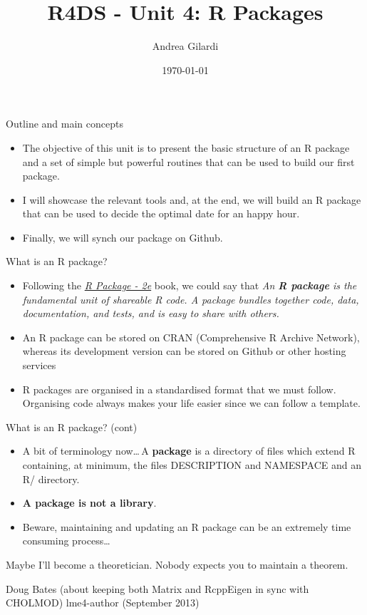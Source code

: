 \documentclass[
hyperref={bookmarks=false},
xcolor={dvipsnames,svgnames*,x11names*}, 
12pt
]{beamer}
\title{R4DS - Unit 4: R Packages}
\author{Andrea Gilardi}
\date{\today}
\begin{document}
\inserttitlepage

\begin{frame}{Outline and main concepts}
\vspace{-0.5cm}
\begin{itemize}
\itemsep 3ex
\item The objective of this unit is to present the basic structure of an R package and a set of simple but powerful routines that can be used to build our first package. 
\item I will showcase the relevant tools and, at the end, we will build an R package that can be used to decide the optimal date for an happy hour. 
\item Finally, we will synch our package on Github. 
\end{itemize}
\end{frame}	

\begin{frame}{What is an R package?}
\vspace{-0.5cm}
\begin{itemize}
\itemsep 3ex
\item Following the \href{https://r-pkgs.org/}{\emph{R Package - 2e}} book, we could say that \emph{An \textbf{R package} is the fundamental unit of shareable R code. A package bundles together code, data, documentation, and tests, and is easy to share with others.} 
\item An R package can be stored on CRAN (Comprehensive R Archive Network), whereas its development version can be stored on Github or other hosting services 
\item R packages are organised in a standardised format that we must follow. Organising code always makes your life easier since we can follow a template. 
\end{itemize}
\end{frame}	

\begin{frame}{What is an R package? (cont)}
\vspace{-0.5cm}
\begin{itemize}
\itemsep 2ex
\item A bit of terminology now\dots\,A \textbf{package} is a directory of files which extend R containing, at minimum, the files DESCRIPTION and NAMESPACE and an R/ directory. 
\item \textbf{A package is not a library}. 
\item Beware, maintaining and updating an R package can be an extremely time consuming process\dots 
\end{itemize}
\vspace{-0.25cm}
\epigraph{Maybe I'll become a theoretician. Nobody expects you to maintain a theorem.}{Doug Bates (about keeping both Matrix and RcppEigen in sync with CHOLMOD) lme4-author (September 2013)}
\end{frame}
\end{document}
